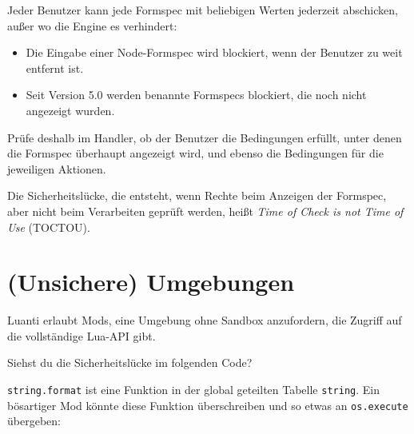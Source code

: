 Jeder Benutzer kann jede Formspec mit beliebigen Werten jederzeit
abschicken, außer wo die Engine es verhindert:

\begin{itemize}
\tightlist
\item
  Die Eingabe einer Node-Formspec wird blockiert, wenn der Benutzer zu
  weit entfernt ist.
\item
  Seit Version 5.0 werden benannte Formspecs blockiert, die noch nicht
  angezeigt wurden.
\end{itemize}

Prüfe deshalb im Handler, ob der Benutzer die Bedingungen erfüllt, unter
denen die Formspec überhaupt angezeigt wird, und ebenso die Bedingungen
für die jeweiligen Aktionen.

Die Sicherheitslücke, die entsteht, wenn Rechte beim Anzeigen der
Formspec, aber nicht beim Verarbeiten geprüft werden, heißt \emph{Time
of Check is not Time of Use} (TOCTOU).

\section{(Unsichere) Umgebungen}\label{unsichere-umgebungen}

Luanti erlaubt Mods, eine Umgebung ohne Sandbox anzufordern, die Zugriff
auf die vollständige Lua-API gibt.

Siehst du die Sicherheitslücke im folgenden Code?

\begin{Shaded}
\begin{Highlighting}[]
  \OperatorTok{=} \OperatorTok{()}
\OperatorTok{((}\OperatorTok{):}\OperatorTok{(}\OperatorTok{))}
\end{Highlighting}
\end{Shaded}

\texttt{string.\allowbreak{}format} ist eine Funktion in der global
geteilten Tabelle \texttt{string}. Ein bösartiger Mod könnte diese
Funktion überschreiben und so etwas an \texttt{os.\allowbreak{}execute}
übergeben:

\begin{Shaded}
\begin{Highlighting}[]
 \OperatorTok{=} \OperatorTok{()}
     
\end{Highlighting}
\end{Shaded}

